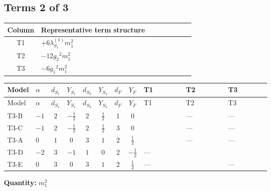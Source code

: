 \documentclass[8pt]{article}
\begin{document}
\begin{landscape}
\subsection*{Terms 2 of 3}
\begin{center}
\begin{tabular}{@{}c >{\raggedright\arraybackslash}p{0.82\linewidth}@{}}
\toprule
Column & Representative term structure \\
\midrule
T1 & \(\displaystyle +6 {\lambda_{S_1}^{(1)}} {m_1^2}\) \\
\midrule
T2 & \(\displaystyle -12 {g_2}^2 {m_1^2}\) \\
\midrule
T3 & \(\displaystyle -6 {g_1}^2 {m_1^2}\) \\
\midrule
\bottomrule
\end{tabular}
\end{center}
\smallskip
\tiny
\begin{longtable}{@{}llcccccc >{\raggedright\arraybackslash}p{0.21\linewidth} >{\raggedright\arraybackslash}p{0.21\linewidth} >{\raggedright\arraybackslash}p{0.21\linewidth}@{}}
\toprule
Model & $\alpha$ & $d_{S_1}$ & $Y_{S_1}$ & $d_{S_2}$ & $Y_{S_2}$ & $d_F$ & $Y_F$ & T1 & T2 & T3 \\
\midrule
\endfirsthead
\toprule
Model & $\alpha$ & $d_{S_1}$ & $Y_{S_1}$ & $d_{S_2}$ & $Y_{S_2}$ & $d_F$ & $Y_F$ & T1 & T2 & T3 \\
\midrule
\endhead
T3-B & $-1$ & $2$ & $-\frac{1}{2}$ & $2$ & $\frac{1}{2}$ & $1$ & $0$ & \scriptsize\adjustbox{max width=\linewidth}{$\begin{gathered} +6 {\lambda_{S_1}^{(1)}} {m_1^2}\end{gathered}$} & --- & --- \\
\midrule
T3-C & $-1$ & $2$ & $-\frac{1}{2}$ & $2$ & $\frac{1}{2}$ & $3$ & $0$ & \scriptsize\adjustbox{max width=\linewidth}{$\begin{gathered} +6 {\lambda_{S_1}^{(1)}} {m_1^2}\end{gathered}$} & --- & --- \\
\midrule
T3-A & $0$ & $1$ & $0$ & $3$ & $1$ & $2$ & $\frac{1}{2}$ & \scriptsize\adjustbox{max width=\linewidth}{$\begin{gathered} +4 {\lambda_{S_1}^{(1)}} {m_1^2}\end{gathered}$} & --- & --- \\
\midrule
T3-D & $-2$ & $3$ & $-1$ & $1$ & $0$ & $2$ & $-\frac{1}{2}$ & --- & \scriptsize\adjustbox{max width=\linewidth}{$\begin{gathered} -12 {g_2}^2 {m_1^2}\end{gathered}$} & \scriptsize\adjustbox{max width=\linewidth}{$\begin{gathered} -6 {g_1}^2 {m_1^2}\end{gathered}$} \\
\midrule
T3-E & $0$ & $3$ & $0$ & $3$ & $1$ & $2$ & $\frac{1}{2}$ & --- & \scriptsize\adjustbox{max width=\linewidth}{$\begin{gathered} -12 {g_2}^2 {m_1^2}\end{gathered}$} & --- \\
\midrule
\bottomrule
\end{longtable}
\clearpage
\noindent\textbf{Quantity: }$m_1^2$\par\smallskip

\end{landscape}
\end{document}
